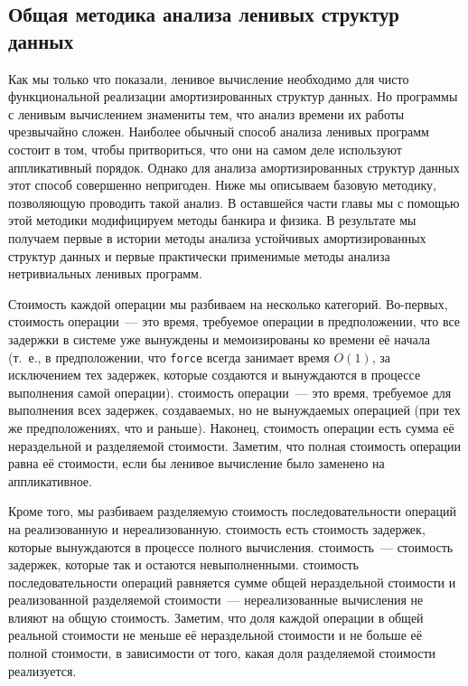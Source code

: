 \subsection{Общая методика анализа ленивых структур данных}
\label{sc:6.2.2}

Как мы только что показали, ленивое вычисление необходимо для чисто
функциональной реализации амортизированных структур данных. Но
программы с ленивым вычислением знамениты тем, что анализ времени их
работы чрезвычайно сложен. Наиболее обычный способ анализа ленивых
программ состоит в том, чтобы притвориться, что они на самом деле
используют аппликативный порядок. Однако для анализа амортизированных
структур данных этот способ совершенно непригоден. Ниже мы описываем
базовую методику, позволяющую проводить такой анализ. В оставшейся
части главы мы с помощью этой методики модифицируем методы банкира и
физика. В результате мы получаем первые в истории методы анализа
устойчивых амортизированных структур данных и первые практически применимые
методы анализа нетривиальных ленивых программ.

Стоимость каждой операции мы разбиваем на несколько категорий. Во-первых,
 стоимость операции~--- это время,
требуемое операции в предположении, что все задержки в системе уже
вынуждены и мемоизированы ко времени её начала (т.~е., в
предположении, что \lstinline!force! всегда занимает время $O(1)$, за
исключением тех задержек, которые создаются и вынуждаются в процессе
выполнения самой операции).  стоимость
операции~--- это время, требуемое для выполнения всех задержек,
создаваемых, но не вынуждаемых операцией (при тех же предположениях,
что и раньше). Наконец,  стоимость операции
есть сумма её нераздельной и разделяемой стоимости. Заметим, что
полная стоимость операции равна её стоимости, если бы ленивое
вычисление было заменено на аппликативное.

Кроме того, мы разбиваем разделяемую стоимость последовательности
операций на реализованную и
нереализованную.  стоимость есть
стоимость задержек, которые вынуждаются в процессе полного
вычисления.  стоимость~--- стоимость
задержек, которые так и остаются невыполненными.  стоимость последовательности операций
равняется сумме общей нераздельной стоимости и реализованной
разделяемой стоимости~--- нереализованные вычисления не влияют на
общую стоимость. Заметим, что доля каждой операции в общей реальной
стоимости не меньше её нераздельной стоимости и не больше её полной
стоимости, в зависимости от того, какая доля разделяемой стоимости
реализуется.

